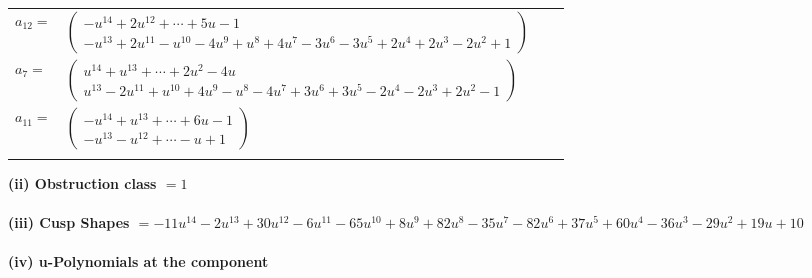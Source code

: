 \documentclass[1p]{elsarticle_modified}
\theoremstyle{definition}
\begin{document}
\begin{tabular}{m{7pt} m{180pt} m{7pt} m{180pt} }
\flushright $a_{12}=$&$\begin{pmatrix}- u^{14}+2 u^{12}+\cdots+5 u-1\\- u^{13}+2 u^{11}- u^{10}-4 u^9+u^8+4 u^7-3 u^6-3 u^5+2 u^4+2 u^3-2 u^2+1\end{pmatrix}$ \\
\flushright $a_{7}=$&$\begin{pmatrix}u^{14}+u^{13}+\cdots+2 u^2-4 u\\u^{13}-2 u^{11}+u^{10}+4 u^9- u^8-4 u^7+3 u^6+3 u^5-2 u^4-2 u^3+2 u^2-1\end{pmatrix}$ \\
\flushright $a_{11}=$&$\begin{pmatrix}- u^{14}+u^{13}+\cdots+6 u-1\\- u^{13}- u^{12}+\cdots- u+1\end{pmatrix}$\\&\end{tabular}
\flushleft \textbf{(ii) Obstruction class $= 1$}\\~\\
\flushleft \textbf{(iii) Cusp Shapes $= -11 u^{14}-2 u^{13}+30 u^{12}-6 u^{11}-65 u^{10}+8 u^9+82 u^8-35 u^7-82 u^6+37 u^5+60 u^4-36 u^3-29 u^2+19 u+10$}\\~\\
\newpage\renewcommand{\arraystretch}{1}
\flushleft \textbf{(iv) u-Polynomials at the component}\newline \\
\end{document}
